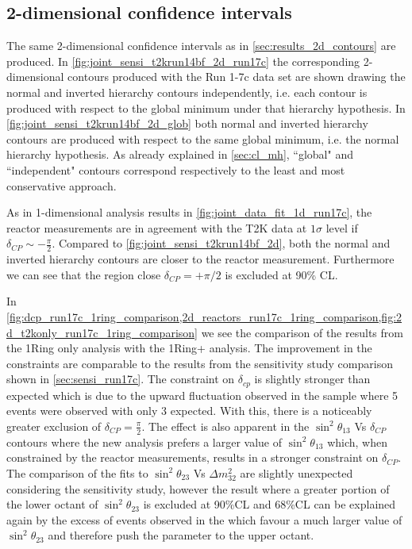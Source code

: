 %
%

\subsection {2-dimensional confidence intervals}
\label{sec:results_2d_contours_run17c}

The same 2-dimensional confidence intervals as in \cref{sec:results_2d_contours} are produced.
In \cref{fig:joint_sensi_t2krun14bf_2d_run17c} the corresponding 2-dimensional contours produced
with the Run 1-7c data set are shown drawing the normal and inverted hierarchy contours independently,
i.e. each contour is produced with respect to the global minimum under that hierarchy hypothesis.
In \cref{fig:joint_sensi_t2krun14bf_2d_glob} both normal and inverted hierarchy contours
are produced with respect to the same global minimum, i.e. the normal hierarchy hypothesis.
As already explained in \cref{sec:cl_mh}, ``global" and ``independent" contours correspond
respectively to the least and most conservative approach.

As in 1-dimensional analysis results
in \cref{fig:joint_data_fit_1d_run17c}, the reactor measurements are 
in agreement with the T2K data at $1\sigma$ level if $\delta_{CP} \sim - \frac{\pi}{2}$. 
Compared to \cref{fig:joint_sensi_t2krun14bf_2d}, both the normal and inverted 
hierarchy contours are closer to the reactor measurement.
Furthermore we can see that the region close $\delta_{CP} = + \pi/2$ is excluded at 90\% CL.

In \cref{fig:dcp_run17c_1ring_comparison,2d_reactors_run17c_1ring_comparison,fig:2d_t2konly_run17c_1ring_comparison}
we see the comparison of the results from the 1Ring only analysis with the 1Ring+\nueCConepi{} analysis. The improvement in the
constraints are comparable to the results from the sensitivity study comparison shown in \cref{sec:sensi_run17c}. The constraint 
on $\delta_{cp}$ is slightly stronger than expected which is due to the upward fluctuation observed in the \nueCConepi{} sample 
where 5 events were observed with only 3 expected. With this, there is a noticeably greater exclusion of $\delta_{CP}=\frac{\pi}{2}$.
The effect is also apparent in the $\sin^2 \theta_{13}$ Vs $\delta_{CP}$ contours where the new analysis prefers a larger value
of $\sin^2 \theta_{13}$ which, when constrained by the reactor measurements, results in a stronger constraint on $\delta_{CP}$. 
The comparison of the fits to $\sin^2 \theta_{23}$ Vs $\Delta m^2_{32}$ are slightly unexpected considering the sensitivity study, however the result where a greater portion of the lower octant of $\sin^2 \theta_{23}$ is excluded at 90\%CL and 68\%CL can be explained again by the excess of events observed in the \nueCConepi{}  which favour a much larger value of $\sin^2 \theta_{23}$ and therefore push the parameter to the upper octant. 

